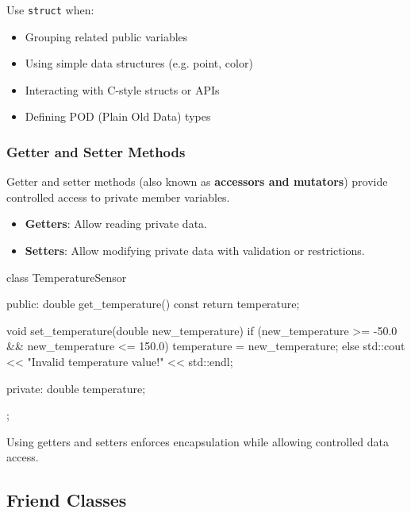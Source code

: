 \vspace{0.5em}

Use \texttt{struct} when:
\vspace{0.5em}
\begin{itemize}
    \item Grouping related public variables
    \item Using simple data structures (e.g. point, color)
    \item Interacting with C-style structs or APIs
    \item Defining POD (Plain Old Data) types
\end{itemize}

\subsubsection{Getter and Setter Methods}

Getter and setter methods (also known as \textbf{accessors and mutators}) provide controlled access to private member variables.

\begin{itemize}
    \item \textbf{Getters}: Allow reading private data.
    \item \textbf{Setters}: Allow modifying private data with validation or restrictions.
\end{itemize}

\begin{exampleblock}
\begin{codeblock}[language=C++]
class TemperatureSensor {
public:
    double get_temperature() const {
        return temperature;
    }

    void set_temperature(double new_temperature) {
        if (new_temperature >= -50.0 && new_temperature <= 150.0) {
            temperature = new_temperature;
        } else {
            std::cout << "Invalid temperature value!" << std::endl;
        }
    }

private:
    double temperature;
};
\end{codeblock}
\end{exampleblock}

Using getters and setters enforces encapsulation while allowing controlled data access.

\subsection{Friend Classes}

